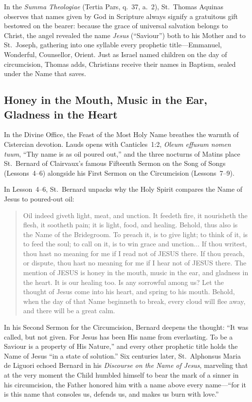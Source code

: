 In the \textit{Summa Theologiae} (Tertia Pars, q.~37, a.~2), St.~Thomas Aquinas
observes that names given by God in Scripture always signify a gratuitous gift
bestowed on the bearer: because the grace of universal salvation belongs to
Christ, the angel revealed the name \textit{Jesus} (``Saviour'') both to his
Mother and to St.~Joseph, gathering into one syllable every prophetic title---Emmanuel,
Wonderful, Counsellor, Orient. Just as Israel named children on the day of
circumcision, Thomas adds, Christians receive their names in Baptism, sealed
under the Name that saves.

\subsection{Honey in the Mouth, Music in the Ear, Gladness in the Heart}

In the Divine Office, the Feast of the Most Holy Name breathes the warmth of
Cistercian devotion. Lauds opens with Canticles~1:2, \textit{Oleum effusum
nomen tuum}, ``Thy name is as oil poured out,'' and the three nocturns of
Matins place St.~Bernard of Clairvaux's famous Fifteenth Sermon on the Song of
Songs (Lessons~4--6) alongside his First Sermon on the Circumcision
(Lessons~7--9).

In Lesson~4--6, St.~Bernard unpacks why the Holy Spirit compares the Name of
Jesus to poured-out oil:

\begin{quote}
Oil indeed giveth light, meat, and unction. It feedeth fire, it nourisheth the
flesh, it sootheth pain; it is light, food, and healing. Behold, thus also is
the Name of the Bridegroom. To preach it, is to give light; to think of it, is
to feed the soul; to call on it, is to win grace and unction... If thou writest,
thou hast no meaning for me if I read not of JESUS there. If thou preach, or
dispute, thou hast no meaning for me if I hear not of JESUS there. The mention
of JESUS is honey in the mouth, music in the ear, and gladness in the heart. It
is our healing too. Is any sorrowful among us? Let the thought of Jesus come
into his heart, and spring to his mouth. Behold, when the day of that Name
beginneth to break, every cloud will flee away, and there will be a great calm.
\end{quote}

In his Second Sermon for the Circumcision, Bernard deepens the thought: ``It
was called, but not given. For Jesus has been His name from everlasting. To be
a Saviour is a property of His Nature,'' and every other prophetic title holds
the Name of Jesus ``in a state of solution.'' Six centuries later,
St.~Alphonsus Maria de Liguori echoed Bernard in his \textit{Discourse on the
Name of Jesus}, marveling that at the very moment the Child humbled himself to
bear the mark of a sinner in his circumcision, the Father honored him with a
name above every name---``for it is this name that consoles us, defends us, and
makes us burn with love.''

